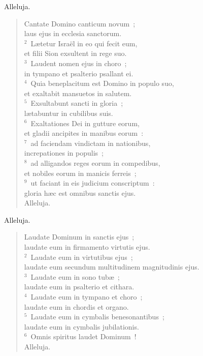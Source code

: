\lettrine[lines=3,image=true,loversize=0.05,lraise=-0.03]{A}{}lleluja. \begin{flushleft}\begin{verse}\vspace{6pt}Cantate Domino canticum novum~;\\ laus ejus in ecclesia sanctorum.\\
${}^{2}$~L\ae tetur Isra\"el in eo qui fecit eum,\\ et filii Sion exsultent in rege suo.\\
${}^{3}$~Laudent nomen ejus in choro~;\\ in tympano et psalterio psallant ei.\\
${}^{4}$~Quia beneplacitum est Domino in populo suo,\\ et exaltabit mansuetos in salutem.\\
${}^{5}$~Exsultabunt sancti in gloria~;\\ l\ae tabuntur in cubilibus suis.\\
${}^{6}$~Exaltationes Dei in gutture eorum,\\ et gladii ancipites in manibus eorum~:\\
${}^{7}$~ad faciendam vindictam in nationibus,\\ increpationes in populis~;\\
${}^{8}$~ad alligandos reges eorum in compedibus,\\ et nobiles eorum in manicis ferreis~;\\
${}^{9}$~ut faciant in eis judicium conscriptum~:\\ gloria h\ae c est omnibus sanctis ejus.\\ Alleluja.\end{verse}\end{flushleft}



\lettrine[lines=3,image=true,loversize=0.05,lraise=-0.03]{A}{}lleluja. \begin{flushleft}\begin{verse}\vspace{6pt}Laudate Dominum in sanctis ejus~;\\ laudate eum in firmamento virtutis ejus.\\
${}^{2}$~Laudate eum in virtutibus ejus~;\\ laudate eum secundum multitudinem magnitudinis ejus.\\
${}^{3}$~Laudate eum in sono tub\ae~;\\ laudate eum in psalterio et cithara.\\
${}^{4}$~Laudate eum in tympano et choro~;\\ laudate eum in chordis et organo.\\
${}^{5}$~Laudate eum in cymbalis benesonantibus~;\\ laudate eum in cymbalis jubilationis.\\
${}^{6}$~Omnis spiritus laudet Dominum~!\\ Alleluja.\end{verse}\end{flushleft}


